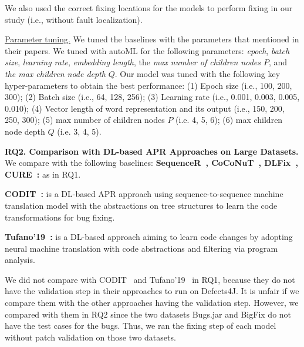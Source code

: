 We also used the correct fixing locations for the models to perform
fixing in our study (i.e., without fault localization).



\underline{Parameter tuning.} We tuned the baselines with the
parameters that mentioned in their papers. We tuned \tool with autoML
\cite{NNI} for the following parameters: {\em epoch}, {\em batch
  size}, {\em learning rate}, {\em embedding length}, the {\em max
  number of children nodes $P$}, and {\em the max children node depth}
$Q$. Our model was tuned with the following key hyper-parameters to
obtain the best performance: (1) Epoch size (i.e., 100, 200, 300); (2)
Batch size (i.e., 64, 128, 256); (3) Learning rate (i.e., 0.001,
0.003, 0.005, 0.010); (4) Vector length of word representation and its
output (i.e., 150, 200, 250, 300); (5) max number of children nodes
$P$ (i.e. 4, 5, 6); (6) max children node depth $Q$ (i.e. 3, 4, 5).

{\bf RQ2. Comparison with DL-based APR Approaches on
  Large Datasets.} We compare {\tool} with the following baselines:
{\bf Sequen\-ceR~\cite{chen2018sequencer},
  CoCoNuT~\cite{lutellier2020coconut}, DLFix~\cite{icse20},
  CURE~\cite{cure-icse21}:} as in RQ1.

{\bf CODIT~\cite{chakrabortycodit}:} is a DL-based APR approach
using sequence-to-sequence machine translation model with the
abstractions on tree structures to learn the code transformations for
bug fixing.

{\bf Tufano'19~\cite{tufano2019learning}:} is a DL-based approach
aiming to learn code changes by adopting neural machine translation
with code abstractions and filtering via program analysis.

We did not compare with CODIT~\cite{chakrabortycodit} and
Tufano'19~\cite{tufano2019learning} in RQ1, because they do not have
the validation step in their approaches to run on Defects4J. It is
unfair if we compare them with the other approaches having the
validation step. However, we compared {\tool} with them in RQ2
since the two datasets Bugs.jar and BigFix do not have the
test cases for the bugs. Thus, we ran the fixing step of each
model without patch validation on those two datasets.


